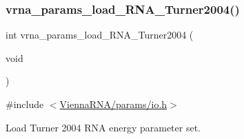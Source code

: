 \subsubsection{\texorpdfstring{vrna\_params\_load\_RNA\_Turner2004()}{vrna\_params\_load\_RNA\_Turner2004()}}
{\footnotesize\ttfamily int vrna\+\_\+params\+\_\+load\+\_\+\+R\+N\+A\+\_\+\+Turner2004 (\begin{DoxyParamCaption}\item[{void}]{ }\end{DoxyParamCaption})}



{\ttfamily \#include $<$\mbox{\hyperlink{io_8h}{Vienna\+R\+N\+A/params/io.\+h}}$>$}



Load Turner 2004 R\+NA energy parameter set. 


